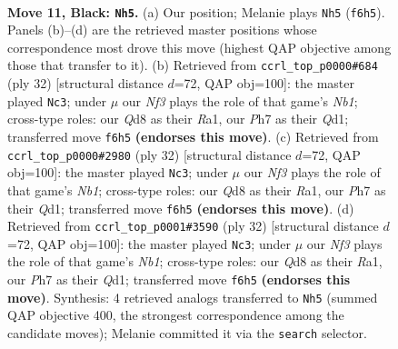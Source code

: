\documentclass[11pt]{article}
\begin{document}
\clearpage

\begin{figure}[p]\centering
\begin{subfigure}{0.46\textwidth}\centering
\resizebox{\linewidth}{!}{%
\newchessgame
\chessboard[
  setfen={r1bq1rk1/pp5p/n1pb1np1/3p1p2/3P1P1N/6P1/PP1NP1BP/R1BQR1K1 b - - 0 11},
  showmover=false,
  pgfstyle=straightmove, color=movearrow, markmove={f6-h5}
]}
\caption{}
\end{subfigure}\hfill
\begin{subfigure}{0.46\textwidth}\centering
\resizebox{\linewidth}{!}{%
\newchessgame
\chessboard[
  setfen={r1bqrbk1/4npp1/p2p1n1p/1p1Pp3/4P3/PP3N1P/B4PP1/RNBQR1K1 w - - 1 17},
  showmover=false,
  pgfstyle=straightmove, color=movearrow, markmove={b1-c3}
]}
\caption{}
\end{subfigure}
\\[4pt]
\begin{subfigure}{0.46\textwidth}\centering
\resizebox{\linewidth}{!}{%
\newchessgame
\chessboard[
  setfen={r1bqrbk1/4npp1/p2p1n1p/1p1Pp3/4P3/PP3N1P/B4PP1/RNBQR1K1 w - - 1 17},
  showmover=false,
  pgfstyle=straightmove, color=movearrow, markmove={b1-c3}
]}
\caption{}
\end{subfigure}\hfill
\begin{subfigure}{0.46\textwidth}\centering
\resizebox{\linewidth}{!}{%
\newchessgame
\chessboard[
  setfen={r1bqrbk1/4npp1/p2p1n1p/1p1Pp3/4P3/PP3N1P/B4PP1/RNBQR1K1 w - - 1 17},
  showmover=false,
  pgfstyle=straightmove, color=movearrow, markmove={b1-c3}
]}
\caption{}
\end{subfigure}
\caption{\textbf{Move 11, Black: \texttt{Nh5}.} (a) Our position; Melanie plays \texttt{Nh5} (\texttt{f6h5}). Panels (b)--(d) are the retrieved master positions whose correspondence most drove this move (highest QAP objective among those that transfer to it). (b) Retrieved from \texttt{ccrl\_top\_p0000\#684} (ply 32) [structural distance $d$=72, QAP obj=100]: the master played \texttt{Nc3}; under $\mu$ our \emph{Nf3} plays the role of that game's \emph{Nb1}; cross-type roles: our \emph{Q}d8 as their \emph{R}a1, our \emph{P}h7 as their \emph{Q}d1; transferred move \texttt{f6h5} \textbf{(endorses this move)}. (c) Retrieved from \texttt{ccrl\_top\_p0000\#2980} (ply 32) [structural distance $d$=72, QAP obj=100]: the master played \texttt{Nc3}; under $\mu$ our \emph{Nf3} plays the role of that game's \emph{Nb1}; cross-type roles: our \emph{Q}d8 as their \emph{R}a1, our \emph{P}h7 as their \emph{Q}d1; transferred move \texttt{f6h5} \textbf{(endorses this move)}. (d) Retrieved from \texttt{ccrl\_top\_p0001\#3590} (ply 32) [structural distance $d$=72, QAP obj=100]: the master played \texttt{Nc3}; under $\mu$ our \emph{Nf3} plays the role of that game's \emph{Nb1}; cross-type roles: our \emph{Q}d8 as their \emph{R}a1, our \emph{P}h7 as their \emph{Q}d1; transferred move \texttt{f6h5} \textbf{(endorses this move)}. Synthesis: 4 retrieved analogs transferred to \texttt{Nh5} (summed QAP objective 400, the strongest correspondence among the candidate moves); Melanie committed it via the \texttt{search} selector.}
\label{fig:thought-m21}
\end{figure}
\end{document}
